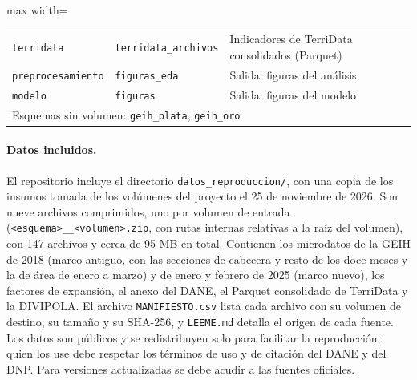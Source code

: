 \begin{table}[!htbp]
\begin{adjustbox}{max width=\linewidth}
\begin{tabular}{l l p{7.2cm}}
\texttt{terridata} & \texttt{terridata\_archivos} & Indicadores de TerriData consolidados (Parquet) \\
\texttt{preprocesamiento} & \texttt{figuras\_eda} & Salida: figuras del análisis \\
\texttt{modelo} & \texttt{figuras} & Salida: figuras del modelo \\
\midrule
\multicolumn{3}{l}{Esquemas sin volumen: \texttt{geih\_plata}, \texttt{geih\_oro}} \\
\bottomrule
\end{tabular}
\end{adjustbox}
\end{table}

\paragraph{Datos incluidos.} El repositorio incluye el directorio \texttt{datos\_reproduccion/}, con una copia de los insumos tomada de los volúmenes del proyecto el 25 de noviembre de 2026. Son nueve archivos comprimidos, uno por volumen de entrada (\texttt{<esquema>\_\_<volumen>.zip}, con rutas internas relativas a la raíz del volumen), con 147 archivos y cerca de 95 MB en total. Contienen los microdatos de la GEIH de 2018 (marco antiguo, con las secciones de cabecera y resto de los doce meses y la de área de enero a marzo) y de enero y febrero de 2025 (marco nuevo), los factores de expansión, el anexo del DANE, el Parquet consolidado de TerriData y la DIVIPOLA. El archivo \texttt{MANIFIESTO.csv} lista cada archivo con su volumen de destino, su tamaño y su SHA-256, y \texttt{LEEME.md} detalla el origen de cada fuente. Los datos son públicos y se redistribuyen solo para facilitar la reproducción; quien los use debe respetar los términos de uso y de citación del DANE y del DNP. Para versiones actualizadas se debe acudir a las fuentes oficiales.

